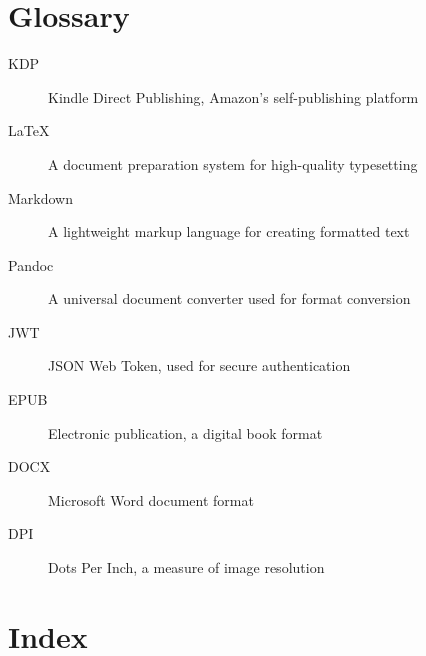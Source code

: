 \documentclass[12pt,a4paper]{book}
\begin{document}
\backmatter

\chapter*{Glossary}

\begin{description}
  \item[KDP] Kindle Direct Publishing, Amazon's self-publishing platform
  \item[LaTeX] A document preparation system for high-quality typesetting
  \item[Markdown] A lightweight markup language for creating formatted text
  \item[Pandoc] A universal document converter used for format conversion
  \item[JWT] JSON Web Token, used for secure authentication
  \item[EPUB] Electronic publication, a digital book format
  \item[DOCX] Microsoft Word document format
  \item[DPI] Dots Per Inch, a measure of image resolution
\end{description}

\chapter*{Index}
\end{document}
